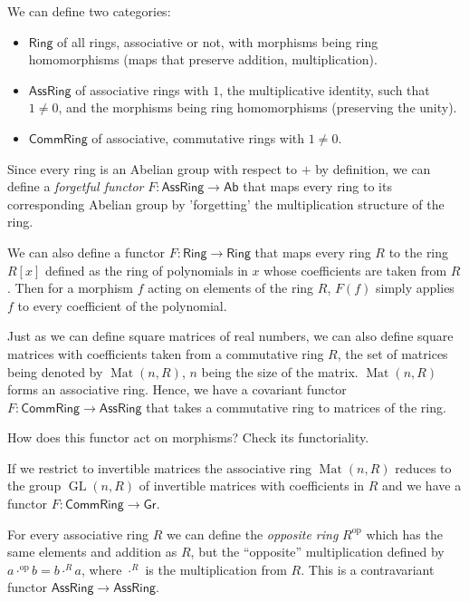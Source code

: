 \documentclass[english,letterpaper]{article}%
\numberwithin{equation}{section}
\numberwithin{figure}{section}
\numberwithin{table}{section}
\theoremstyle{definition}
\theoremstyle{definition}
\theoremstyle{definition}
\theoremstyle{plain}
\theoremstyle{plain}
\theoremstyle{plain}
\theoremstyle{plain}
\theoremstyle{remark}
\theoremstyle{remark}
\DeclareMathOperator{\Mat}{Mat}
\DeclareMathOperator{\GL}{GL}
\begin{document}
We can define two categories:
\begin{itemize}
\item $\mathsf{Ring}$ of all rings, associative or not, with morphisms
being ring homomorphisms (maps that preserve addition, multiplication).
\item $\mathsf{AssRing}$ of associative rings with $1$, the multiplicative
identity, such that $1\neq0$, and the morphisms being ring homomorphisms
(preserving the unity).
\item $\mathsf{CommRing}$ of associative, commutative rings with $1\neq0$. 
\end{itemize}
\begin{example}
Since every ring is an Abelian group with respect to $+$ by definition,
we can define a \emph{forgetful functor} $F:\mathsf{AssRing}\rightarrow\mathsf{Ab}$
that maps every ring to its corresponding Abelian group by 'forgetting'
the multiplication structure of the ring.
\end{example}
%
\begin{example}
We can also define a functor $F:\mathsf{Ring}\rightarrow\mathsf{Ring}$
that maps every ring $R$ to the ring $R[x]$ defined as the ring
of polynomials in $x$ whose coefficients are taken from $R$. Then
for a morphism $f$ acting on elements of the ring $R$, $F\left(f\right)$
simply applies $f$ to every coefficient of the polynomial.
\end{example}
%
\begin{example}
Just as we can define square matrices of real numbers, we can also
define square matrices with coefficients taken from a commutative
ring $R$, the set of matrices being denoted by $\Mat(n,R)$,
$n$ being the size of the matrix. $\Mat(n,R)$ forms an associative
ring. Hence, we have a covariant functor $F:\mathsf{CommRing}\rightarrow\mathsf{AssRing}$
that takes a commutative ring to matrices of the ring. 
\end{example}
\begin{xca}
How does this functor act on morphisms? Check its functoriality.
\end{xca}
\begin{example}
If we restrict to invertible matrices the associative ring $\Mat(n,R)$
reduces to the group $\GL(n,R)$ of invertible matrices with
coefficients in $R$ and we have a functor $F:\mathsf{CommRing}\rightarrow\mathsf{Gr}$.
\end{example}
%
\begin{example}
For every associative ring $R$ we can define the \emph{opposite
ring} $R^{\text{op}}$ which has the same elements and addition as
$R$, but the ``opposite'' multiplication defined by $a\cdot^{\text{op}}b=b\cdot^{R}a$,
where $\cdot^{R}$ is the multiplication from $R$. This is a contravariant
functor $\mathsf{AssRing}\to\mathsf{AssRing}$.
\end{example}
\end{document}

